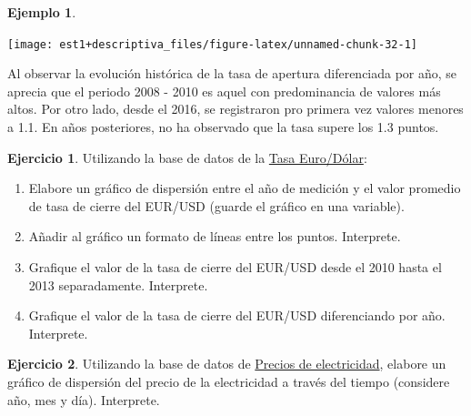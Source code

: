 \documentclass[
  11pt,
]{book}
\providecommand{\tightlist}{%
  \setlength{\itemsep}{0pt}\setlength{\parskip}{0pt}}
\theoremstyle{definition}
\theoremstyle{definition}
\newtheorem{example}{Ejemplo}[chapter]
\theoremstyle{definition}
\newtheorem{exercise}{Ejercicio}[chapter]
\theoremstyle{definition}
\theoremstyle{remark}
\begin{document}
\begin{example}
\begin{enumerate}
  \begin{center}\texttt{[image: est1+descriptiva\_files/figure-latex/unnamed-chunk-32-1]} \end{center}

  Al observar la evolución histórica de la tasa de apertura diferenciada por año, se aprecia que el periodo 2008 - 2010 es aquel con predominancia de valores más altos. Por otro lado, desde el 2016, se registraron pro primera vez valores menores a 1.1. En años posteriores, no ha observado que la tasa supere los 1.3 puntos.
\end{enumerate}

\end{example}

\begin{exercise}

Utilizando la base de datos de la \hyperref[TasaEURUSD]{Tasa Euro/Dólar}:

\begin{enumerate}
\def\labelenumi{\arabic{enumi}.}
\tightlist
\item
  Elabore un gráfico de dispersión entre el año de medición y el valor promedio de tasa de cierre del EUR/USD (guarde el gráfico en una variable).
\item
  Añadir al gráfico un formato de líneas entre los puntos. Interprete.
\item
  Grafique el valor de la tasa de cierre del EUR/USD desde el 2010 hasta el 2013 separadamente. Interprete.
\item
  Grafique el valor de la tasa de cierre del EUR/USD diferenciando por año. Interprete.
\end{enumerate}

\end{exercise}

\begin{exercise}
Utilizando la base de datos de \hyperref[PreciosElectricidad]{Precios de electricidad}, elabore un gráfico de dispersión del precio de la electricidad a través del tiempo (considere año, mes y día). Interprete.
\end{exercise}
\end{document}
